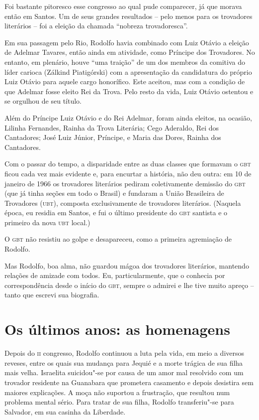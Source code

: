 Foi bastante pitoresco esse congresso ao qual pude comparecer, já que
morava então em Santos. Um de seus grandes resultados -- pelo menos
para os trovadores literários -- foi a eleição da chamada
``nobreza trovadoresca''.

Em sua passagem pelo Rio, Rodolfo havia combinado com Luiz Otávio a
eleição de Adelmar Tavares, então ainda em atividade, como Príncipe dos
Trovadores. No entanto, em plenário, houve ``uma
traição'' de um dos membros da comitiva do líder carioca
(Zálkind Piatigórski) com a apresentação da candidatura do próprio Luiz
Otávio para aquele cargo honorífico. Este aceitou, mas com a condição
de que Adelmar fosse eleito Rei da Trova. Pelo resto da vida, Luiz
Otávio ostentou e se orgulhou de seu título.

Além do Príncipe Luiz Otávio e do Rei Adelmar, foram ainda eleitos, na
ocasião, Lilinha Fernandes, Rainha da Trova Literária; Cego Aderaldo,
Rei dos Cantadores; José Luiz Júnior, Príncipe, e Maria das Dores,
Rainha dos Cantadores.

Com o passar do tempo, a disparidade entre as duas classes que formavam
o \textsc{gbt} ficou cada vez mais evidente e, para encurtar a história, não deu
outra: em 10 de janeiro de 1966 os trovadores literários pediram
coletivamente demissão do \textsc{gbt} (que já tinha seções em todo o Brasil) e
fundaram a União Brasileira de Trovadores (\textsc{ubt}), composta
exclusivamente de trovadores literários. (Naquela época, eu residia em
Santos, e fui o último presidente do \textsc{gbt} santista e o primeiro da nova
\textsc{ubt} local.)

O \textsc{gbt} não resistiu ao golpe e desapareceu, como a primeira agremiação
de Rodolfo.

Mas Rodolfo, boa alma, não guardou mágoa dos trovadores literários,
mantendo relações de amizade com todos. Eu, particularmente, que o
conhecia por correspondência desde o início do \textsc{gbt}, sempre o admirei e
lhe tive muito apreço -- tanto que escrevi sua biografia.

\section{Os últimos anos: as homenagens}


Depois do \textsc{ii} congresso, Rodolfo continuou a luta pela vida, em meio a
diversos reveses, entre os quais sua mudança para Jequié e a morte
trágica de sua filha mais velha. Israelita suicidou"-se por causa de
um amor mal resolvido com um trovador residente na Guanabara que
prometera casamento e depois desistira sem maiores explicações. A moça
não suportou a frustração, que resultou num problema mental sério. Para
tratar de sua filha, Rodolfo transferiu"-se para Salvador, em sua
casinha da Liberdade.

